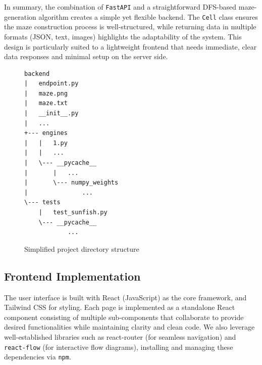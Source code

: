 \documentclass[12pt,a4paper]{article}
\begin{document}
In summary, the combination of \texttt{FastAPI} and a straightforward DFS-based maze-generation algorithm creates a simple yet flexible backend. The \texttt{Cell} class ensures the maze construction process is well-structured, while returning data in multiple formats (JSON, text, images) highlights the adaptability of the system. This design is particularly suited to a lightweight frontend that needs immediate, clear data responses and minimal setup on the server side.
\begin{figure}[ht]
  \begin{center}
    \begin{minipage}{0.4\linewidth}
      \begin{lstlisting}[numbers=none,frame=none,basicstyle=\ttfamily\footnotesize,breaklines=true]
backend
|   endpoint.py
|   maze.png
|   maze.txt
|   __init__.py
|   ...
+--- engines
|   |   1.py
|   |   ...
|   \--- __pycache__
|       |   ...
|       \--- numpy_weights
|               ...
\--- tests
    |   test_sunfish.py
    \--- __pycache__
            ...
      \end{lstlisting}
    \end{minipage}
  \end{center}
  \caption{Simplified project directory structure }
  \label{fig:directory-structure}
\end{figure}


  \subsection{Frontend Implementation}

\label{sec:frontend}

The user interface is built with React (JavaScript) as the core framework, and Tailwind CSS for styling. Each page is implemented as a standalone React component consisting of multiple sub-components that collaborate to provide desired functionalities while maintaining clarity and clean code. We also leverage well-established libraries such as react-router (for seamless navigation) and \texttt{react-flow} (for interactive flow diagrams), installing and managing these dependencies via \texttt{npm}.
\end{document}
